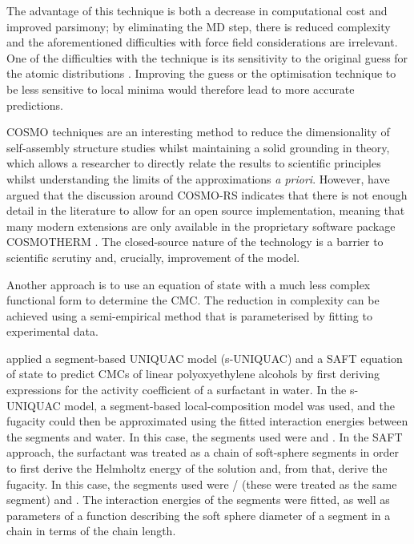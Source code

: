The advantage of this technique is both a decrease in computational cost and
improved parsimony; by eliminating the MD step, there is reduced complexity and
the aforementioned difficulties with force field considerations are irrelevant.
One of the difficulties with the technique is its sensitivity to the original
guess for the atomic distributions
\cite{klamtCOSMOplexSelfconsistentSimulation2019}. Improving the guess or the
optimisation technique to be less sensitive to local minima would therefore lead
to more accurate predictions.

COSMO techniques are an interesting method to reduce the dimensionality of
self-assembly structure studies whilst maintaining a solid grounding in theory,
which allows a researcher to directly relate the results to scientific
principles whilst understanding the limits of the approximations \emph{a
priori}. However, \citet{herbertDielectricContinuumMethods2021} have argued that
the discussion around COSMO-RS indicates that there is not enough detail in the
literature to allow for an open source implementation, meaning that many modern
extensions are only available in the proprietary software package
\textsc{COSMOTHERM} \cite{eckertFastSolventScreening2002}. The closed-source
nature of the technology is a barrier to scientific scrutiny and, crucially,
improvement of the model.

Another approach is to use an equation of state with a much less complex
functional form to determine the CMC. The reduction in complexity can be
achieved using a semi-empirical method that is parameterised by fitting to
experimental data.

\citet{liStudiesUNIQUACSAFT1998} applied a segment-based UNIQUAC model
(s-UNIQUAC) and a SAFT equation of state to predict CMCs of linear
polyoxyethylene alcohols by first deriving expressions for the activity
coefficient of a surfactant in water. In the s-UNIQUAC model, a segment-based
local-composition model was used, and the fugacity could then be approximated
using the fitted interaction energies between the segments and water. In this
case, the segments used were  and . In the SAFT approach, the
surfactant was treated as a chain of soft-sphere segments in order to first
derive the Helmholtz energy of the solution and, from that, derive the fugacity.
In this case, the segments used were / (these were treated as
the same segment) and . The interaction energies of the segments were
fitted, as well as parameters of a function describing the soft sphere diameter
of a segment in a chain in terms of the chain length.

